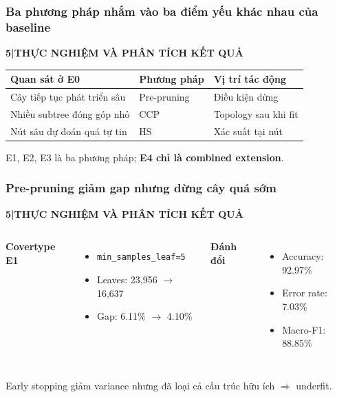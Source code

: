 \documentclass[aspectratio=169,12pt]{beamer}
\newcommand{\chaptertag}[2]{%
  \vspace{-0.16cm}%
  {\scriptsize\bfseries\textcolor{boxframe}{#1\enspace |\enspace #2}}\par
  \vspace{0.12cm}%
}
\begin{document}
\begin{frame}
  \frametitle{Ba phương pháp nhắm vào ba điểm yếu khác nhau của baseline}
  \chaptertag{5}{THỰC NGHIỆM VÀ PHÂN TÍCH KẾT QUẢ}
  \small
  \begin{tabularx}{\textwidth}{@{}L{3.1cm}L{3.0cm}Y@{}}
    \toprule
    \textbf{Quan sát ở E0} & \textbf{Phương pháp} & \textbf{Vị trí tác động} \\
    \midrule
    Cây tiếp tục phát triển sâu & Pre-pruning & Điều kiện dừng \\
    Nhiều subtree đóng góp nhỏ & CCP & Topology sau khi fit \\
    Nút sâu dự đoán quá tự tin & HS & Xác suất tại nút \\
    \bottomrule
  \end{tabularx}
  \par\vspace{0.38cm}
  \begin{tcolorbox}[focusbox,width=0.91\textwidth,top=2mm,bottom=2mm]
    \centering
    E1, E2, E3 là ba phương pháp; \textbf{E4 chỉ là combined extension}.
  \end{tcolorbox}
\end{frame}

\begin{frame}
  \frametitle{Pre-pruning giảm gap nhưng dừng cây quá sớm}
  \chaptertag{5}{THỰC NGHIỆM VÀ PHÂN TÍCH KẾT QUẢ}
  \begin{columns}[T,onlytextwidth]
      \textbf{Covertype E1}
      \begin{itemize}
        \item \texttt{min\_samples\_leaf=5}
        \item Leaves: 23,956 $\rightarrow$ 16,637
        \item Gap: 6.11\% $\rightarrow$ 4.10\%
      \end{itemize}
      \textbf{Đánh đổi}
      \begin{itemize}
        \item Accuracy: 92.97\%
        \item Error rate: 7.03\%
        \item Macro-F1: 88.85\%
      \end{itemize}
  \end{columns}
  \vspace{0.35cm}
  \begin{tcolorbox}[riskbox,width=0.90\textwidth,top=2mm,bottom=2mm]
    \centering
    Early stopping giảm variance nhưng đã loại cả cấu trúc hữu ích $\Rightarrow$ underfit.
  \end{tcolorbox}
\end{frame}
\end{document}
